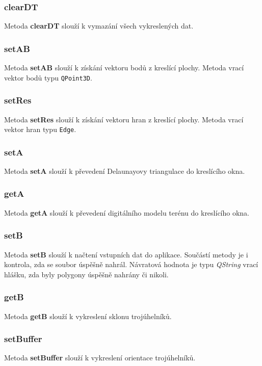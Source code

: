 \documentclass[a4paper, 12pt]{article}
\begin{document}
\subsubsection*{clearDT}
Metoda \textbf{clearDT} slouží k vymazání všech vykreslených dat.

\subsubsection*{setAB}
Metoda \textbf{setAB} slouží k získání vektoru bodů z kreslící plochy. Metoda vrací vektor bodů typu \texttt{QPoint3D}.

\subsubsection*{setRes}
Metoda \textbf{setRes} slouží k získání vektoru hran z kreslící plochy. Metoda vrací vektor hran typu \texttt{Edge}.

\subsubsection*{setA}
Metoda \textbf{setA} slouží k převedení Delaunayovy triangulace do kreslícího okna.

\subsubsection*{getA}
Metoda \textbf{getA} slouží k převedení digitálního modelu terénu do kreslícího okna.

\subsubsection*{setB}
Metoda \textbf{setB} slouží k načtení vstupních dat do aplikace. Součástí metody je i kontrola, zda se soubor úspěšně nahrál. Návratová hodnota je typu \textsl{QString} vrací hlášku, zda byly polygony úspěšně nahrány či nikoli.

\subsubsection*{getB}
Metoda \textbf{getB} slouží k vykreslení sklonu trojúhelníků.

\subsubsection*{setBuffer}
Metoda \textbf{setBuffer} slouží k vykreslení orientace trojúhelníků.
\end{document}
